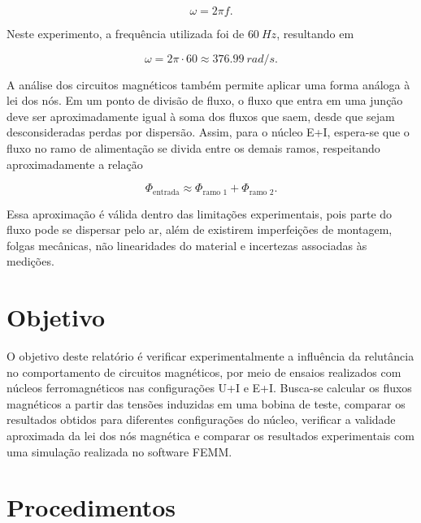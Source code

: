 \documentclass[11pt,a4paper]{article}
\begin{document}
\begin{equation} 
    \omega = 2 \pi f . 
    \label{eq:omega} 
\end{equation}

Neste experimento, a frequência utilizada foi de \(\SI{60}{Hz}\), resultando em

\begin{equation} 
    \omega = 2 \pi \cdot 60 \approx \SI{376,99}{rad/s}. 
    \label{eq:omega_valor} 
\end{equation}

A análise dos circuitos magnéticos também permite aplicar uma forma análoga à lei dos nós. Em um ponto de divisão de fluxo, o fluxo que entra em uma junção deve ser aproximadamente igual à soma dos fluxos que saem, desde que sejam desconsideradas perdas por dispersão. Assim, para o núcleo E+I, espera-se que o fluxo no ramo de alimentação se divida entre os demais ramos, respeitando aproximadamente a relação

\begin{equation}
    \Phi_{\text{entrada}} \approx \Phi_{\text{ramo 1}} + \Phi_{\text{ramo 2}} . \label{eq:lei_nos} 
\end{equation}

Essa aproximação é válida dentro das limitações experimentais, pois parte do fluxo pode se dispersar pelo ar, além de existirem imperfeições de montagem, folgas mecânicas, não linearidades do material e incertezas associadas às medições.

\section{Objetivo} O objetivo deste relatório é verificar experimentalmente a influência da relutância no comportamento de circuitos magnéticos, por meio de ensaios realizados com núcleos ferromagnéticos nas configurações U+I e E+I. Busca-se calcular os fluxos magnéticos a partir das tensões induzidas em uma bobina de teste, comparar os resultados obtidos para diferentes configurações do núcleo, verificar a validade aproximada da lei dos nós magnética e comparar os resultados experimentais com uma simulação realizada no software FEMM.

\section{Procedimentos} 
\end{document}
